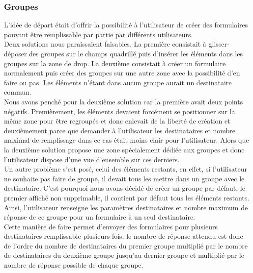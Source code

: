 \documentclass{sigplanconf}
\begin{document}
\subsubsection{Groupes}
L'idée de départ était d'offrir la possibilité à l'utilisateur de créer des formulaires pouvant être remplissable par partie par différents utilisateurs.\\
Deux solutions nous paraissaient faisables. La première consistait à glisser-déposer des groupes sur le champs quadrillé puis d'insérer les éléments dans les groupes sur la zone de drop. La deuxième consistait à créer un formulaire normalement puis créer des groupes sur une autre zone avec la possibilité d'en faire ou pas. Les éléments n'étant dans aucun groupe aurait un destinataire commun.\\
Nous avons penché pour la deuxième solution car la première avait deux points négatifs. Premièrement, les éléments devaient forcément se positionner sur la même zone pour être regroupés et donc enlevait de la liberté de création et deuxièmement parce que demander à l'utilisateur les destinataires et nombre maximal de remplissage dans ce cas était moins clair pour l'utilisateur. Alors que la deuxième solution propose une zone spécialement dédiée aux groupes et donc l'utilisateur dispose d'une vue d'ensemble sur ces derniers.\\
Un autre problème s'est posé, celui des éléments restants, en effet, si l'utilisateur ne souhaite pas faire de groupe, il devait tous les mettre dans un groupe avec le destinataire. C'est pourquoi nous avons décidé de créer un groupe par défaut, le premier affiché non supprimable, il contient par défaut tous les éléments restants. Ainsi, l'utilisateur renseigne les paramètres destinataires et nombre maximum de réponse de ce groupe pour un formulaire à un seul destinataire.\\
Cette manière de faire permet d'envoyer des formulaires pour plusieurs destinataires remplissable plusieurs fois, le nombre de réponse attendu est donc de l'ordre du nombre de destinataires du premier groupe multiplié par le nombre de destinataires du deuxième groupe jusqu'au dernier groupe et multiplié par le nombre de réponse possible de chaque groupe.
\end{document}
